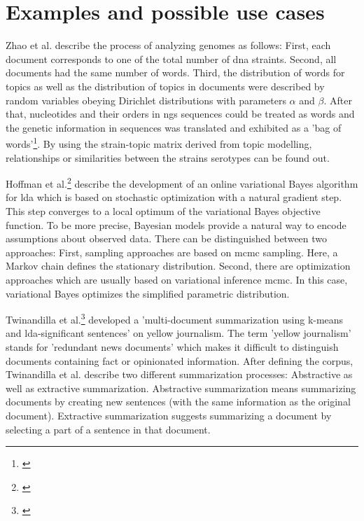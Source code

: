 \section{Examples and possible use cases}\label{lda_examples}

Zhao et al. describe the process of analyzing genomes as follows: First, each document corresponds to one of the total number of \gls{dna} straints. Second, all documents had the same number of words. Third, the distribution of words for topics as well as the distribution of topics in documents were described by random variables obeying Dirichlet distributions with parameters $\alpha$ and $\beta$. After that, nucleotides and their orders in \gls{ngs} sequences could be treated as words and the genetic information in sequences was translated and exhibited as a 'bag of words'\footnote{\autocite{zhao_2016}}. By using the strain-topic matrix derived from topic modelling, relationships or similarities between the strains serotypes can be found out. 

Hoffman et al.\footnote{\autocite{hoffman_2010}} describe the development of an online variational Bayes algorithm for \gls{lda} which is based on stochastic optimization with a natural gradient step. This step converges to a local optimum of the variational Bayes objective function.
To be more precise, Bayesian models provide a natural way to encode assumptions about observed data.
There can be distinguished between two approaches: First, sampling approaches are based on \gls{mcmc} sampling. Here, a Markov chain defines the stationary distribution.
Second, there are optimization approaches which are usually based on variational inference \gls{mcmc}. In this case, variational Bayes optimizes the simplified parametric distribution.

Twinandilla et al.\footnote{\autocite{twinandilla_2018}} developed a 'multi-document summarization using k-means and \gls{lda}-significant sentences' on yellow journalism. The term 'yellow journalism' stands for 'redundant news documents' which makes it difficult to distinguish documents containing fact or opinionated information. After defining the corpus, Twinandilla et al. describe two different summarization processes: Abstractive as well as extractive summarization. Abstractive summarization means summarizing documents by creating new sentences (with the same information as the original document). Extractive summarization suggests summarizing a document by selecting a part of a sentence in that document.

